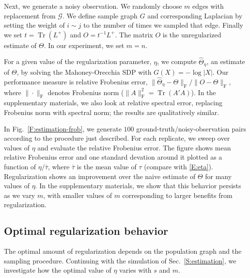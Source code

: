 \documentclass[12pt]{article}
\DeclareMathOperator*{\Tr}{Tr}
\theoremstyle{plain}
\begin{document}
Next, we generate a noisy observation.  We randomly choose $m$ edges
with replacement from $\mathcal{G}$.  We define sample graph $G$
and corresponding Laplacian by setting the weight of $i \sim j$
to the number of times we sampled that edge.  Finally we set
$t = \Tr(L^+)$ and $O = t^{-1} L^+$.  The matrix $O$ is the
unregularized estimate of $\Theta$.  In our experiment, we set $m = n$.

For a given value of the regularization parameter, $\eta$, we compute
$\hat \Theta_\eta$, an estimate of $\Theta$, by solving the
Mahoney-Orecchia SDP with $G(X) = -\log|X|$.  Our performance measure
is relative Frobenius error, $\| \hat \Theta_\eta - \Theta \|_\mathrm{F} / \| O - \Theta
\|_\mathrm{F}$, where $\| \cdot \|_\mathrm{F}$ denotes Frobenius norm
($\|A\|_\mathrm{F}^2 = \Tr(A' A)$).  In the supplementary materials,
we also look at relative spectral error, replacing Frobenius norm with
spectral norm; the results are qualitatively similar.


In Fig.~\ref{F:estimation-frob}, we generate $100$
ground-truth/noisy-observation pairs according to the procedure just described.  For each
replicate, we sweep over values of $\eta$ and evaluate the relative
Frobenius error.  The figure shows mean relative Frobenius error and
one standard devation around it plotted as a function of
$\eta / \bar \tau$, where $\bar \tau$ is the mean value of $\tau$
(compare with \eqref{E:eta}).  Regularization shows an improvement
over the naive estimate of $\Theta$ for many values of $\eta$.  In the
supplementary materials, we show that this behavior persists as we
vary $m$, with smaller values of $m$ corresponding to larger benefits
from regularization.



\subsection{Optimal regularization behavior}

The optimal amount of regularization depends on the population graph
and the sampling procedure.  Continuing with the simulation of
Sec.~\ref{S:estimation}, we investigate how the optimal value of
$\eta$ varies with $s$ and $m$.
\end{document}
